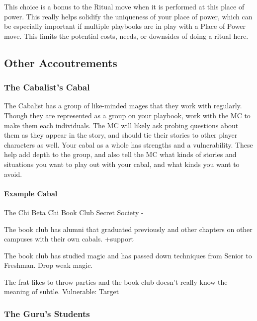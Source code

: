 \documentclass[
]{memoir}
\begin{document}
This choice is a bonus to the Ritual move when it is performed at this
place of power. This really helps solidify the uniqueness of your place
of power, which can be especially important if multiple playbooks are in
play with a Place of Power move. This limits the potential costs, needs,
or downsides of doing a ritual here.

\hypertarget{other-accoutrements}{%
\subsection{Other Accoutrements}\label{other-accoutrements}}

\hypertarget{the-cabalists-cabal}{%
\subsubsection{The Cabalist's Cabal}\label{the-cabalists-cabal}}

The Cabalist has a group of like-minded mages that they work with
regularly. Though they are represented as a group on your playbook, work
with the MC to make them each individuals. The MC will likely ask
probing questions about them as they appear in the story, and should tie
their stories to other player characters as well. Your cabal as a whole
has strengths and a vulnerability. These help add depth to the group,
and also tell the MC what kinds of stories and situations you want to
play out with your cabal, and what kinds you want to avoid.

\hypertarget{example-cabal}{%
\paragraph{Example Cabal}\label{example-cabal}}

The Chi Beta Chi Book Club Secret Society -

The book club has alumni that graduated previously and other chapters on
other campuses with their own cabals. +support

The book club has studied magic and has passed down techniques from
Senior to Freshman. Drop weak magic.

The frat likes to throw parties and the book club doesn't really know
the meaning of subtle. Vulnerable: Target

\hypertarget{the-gurus-students}{%
\subsubsection{The Guru's Students}\label{the-gurus-students}}
\end{document}
